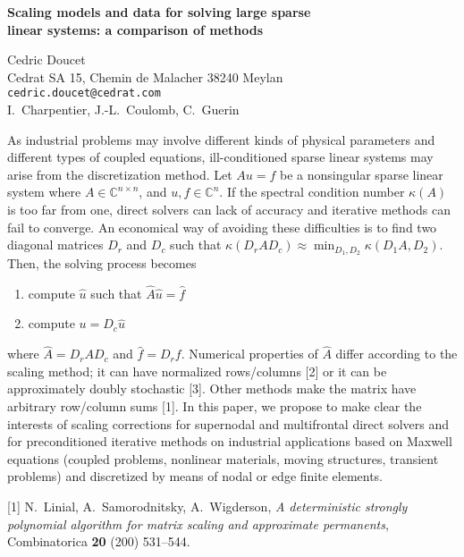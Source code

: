 \documentclass[twosided]{report}
\begin{document}
\begin{center}
{\large			%
{\bf Scaling models and data for solving large sparse \\
linear systems: a comparison of methods}}

	Cedric Doucet \\
	Cedrat SA 15, Chemin de Malacher 38240 Meylan \\
	{\tt cedric.doucet@cedrat.com} \\
	I.~Charpentier, J.-L.~Coulomb, C.~Guerin
\end{center}
As industrial problems may involve different kinds of
physical parameters and different types of coupled
equations, ill-conditioned sparse linear systems may arise
from the discretization method. Let $Au=f$ be a nonsingular
sparse linear system where $A\in \mathbb{C}^{n\times n}$,
and $u,f\in \mathbb{C}^n$. If the spectral condition number
$\kappa(A)$ is too far from one, direct solvers can lack of
accuracy and iterative methods can fail to converge. An
economical way of avoiding these difficulties is to find two
diagonal matrices $D_r$ and $D_c$ such that
$\kappa(D_rAD_c) \approx
\min_{D_1,D_2} \kappa(D_1A,D_2)$.
Then,
the solving process becomes \begin{enumerate} \item compute
$\hat{u}$ such that $\hat{A}\hat{u}=\hat{f}$ \item compute
$u = D_c\hat{u}$ \end{enumerate} where $\hat{A}= D_rAD_c$
and $\hat{f}=D_rf$.
Numerical properties of $\hat{A}$ differ
according to the scaling method; it can have normalized
rows/columns [2] or it can be approximately doubly
stochastic [3]. Other methods make the matrix have arbitrary
row/column sums [1]. In this paper, we propose to make clear
the interests of scaling corrections for supernodal and
multifrontal direct solvers and for preconditioned iterative
methods on industrial applications based on Maxwell
equations (coupled problems, nonlinear materials, moving
structures, transient problems) and discretized by means of
nodal or edge finite elements.

[1] N.~Linial, A.~Samorodnitsky,
A.~Wigderson, {\em A deterministic strongly polynomial
algorithm for matrix scaling and approximate permanents},
Combinatorica {\bf 20} (200) 531--544.
\end{document}
